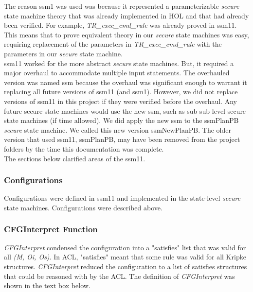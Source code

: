 The reason ssm1 was used was because it represented a parameterizable \emph{secure} state machine theory that was already implemented in HOL and that had already been verified.  For example, \emph{TR_exec_cmd_rule} was already proved in ssm11.  This means that to prove equivalent theory in our \emph{secure} state machines was easy, requiring replacement of the parameters in \emph{TR_exec_cmd_rule} with the parameters in our \emph{secure} state machine.  \\
  
ssm11 worked for the more abstract \emph{secure} state machines.  But, it required a major overhaul to accommodate multiple input statements.  The overhauled version was named ssm because the overhaul was significant enough to warrant it replacing all future versions of ssm11 (and ssm1).  However, we did not replace versions of ssm11 in this project if they were verified before the overhaul.  Any future secure state machines would use the new ssm, such as sub-sub-level secure state machines (if time allowed).  We did apply the new ssm to the ssmPlanPB \emph{secure} state machine.  We called this new version ssmNewPlanPB.  The older version that used ssm11, ssmPlanPB, may have been removed from the project folders by the time this documentation was complete.\\
  
 The sections below clarified areas of the ssm11.\\

  
\subsubsection{Configurations}
\label{sec:configurations-1}

Configurations were defined in ssm11 and implemented in the state-level \emph{secure} state machines.  Configurations were described above.  

  
\subsubsection{CFGInterpret Function}
\label{sec:cfgint-funct}

\emph{CFGInterpret} condensed the configuration into a "satisfies" list that was valid for all \emph{(M, Oi, Os)}.  In ACL, "satisfies" meant that some rule was valid for all Kripke structures.  \emph{CFGInterpret} reduced the configuration to a list of satisfies structures that could be reasoned with by the ACL. The definition of \emph{CFGInterpret} was shown in the text box below.\\
  

